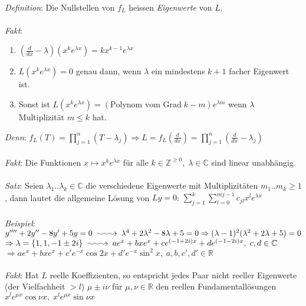 \documentclass[12pt,a4paper,titlepage]{article}
\makeatletter
\newcommand{\longsquiggly}{\xymatrix{{}\ar@{~>}[r]&{}}}
\makeatother
\begin{document}
\\
\textit{Definition}: Die Nullstellen von $f_L$ heissen \emph{Eigenwerte} von $L$. \\
\\
\textit{Fakt}: \begin{enumerate}[label=(\alph*)]
\item $(\frac{d}{dx}-\lambda)(x^ke^{\lambda x})=kx^{k-1}e^{\lambda x}$
\item $L(x^ke^{\lambda x})=0$ genau dann, wenn $\lambda$ ein mindestens $k+1$ facher Eigenwert ist.
\item Sonst ist $L(x^ke^{\lambda x})=(\text{Polynom vom Grad}\; k-m)e^{\lambda m}$ wenn $\lambda$ Multiplizität $m\leq k$ hat.
\end{enumerate}
\textit{Denn}: $f_L(T)=\prod\limits_{j=1}^n(T-\lambda_j) \Rightarrow L=f_L(\frac{d}{dx})=\prod\limits_{j=1}^n(\frac{d}{dx}-\lambda_j)$ \\
\\
\textit{Fakt}: Die Funktionen $x\mapsto x^ke^{\lambda x}$ für alle $k\in\mathbb{Z}^{\geq0},\;\lambda\in\mathbb{C}$ sind linear unabhängig. \\
\\
\textit{Satz}: Seien $\lambda_1..\lambda_k\in\mathbb{C}$ die verschiedene Eigenwerte mit Multiplizitäten $m_1..m_k\geq 1$, dann lautet die allgemeine Lösung von $Ly=0$: $\sum_{j=1}^k\sum_{l=0}^{mj-1} c_{jl}x^le^{\lambda x}$ \\
\\
\textit{Beispiel}: $y''''+2y''-8y'+5y=0 \longsquiggly \lambda^4+2\lambda^2-8\lambda+5=0 \Rightarrow (\lambda-1)^2(\lambda^2+2\lambda+5)=0$ \\
$\Rightarrow \lambda=\{1,1,-1\pm2i\} \longsquiggly ae^x+bxe^x+ce^{(-1+2i)x}+de^{(-1-2i)x},\;c,d\in\mathbb{C} $ \\
$\Rightarrow ae^x+bxe^x+c'e^{-x}\cos 2x+d'e^{-x}\sin^2x,\;a,b,c',d'\in\mathbb{R}$ \\
\\
\textit{Fakt}: Hat $L$ reelle Koeffizienten, so entspricht jedes Paar nicht reeller Eigenwerte (der Vielfachheit $>l$) $\mu\pm i\nu$ für $\mu,\nu\in\mathbb{R}$ den reellen Fundamentallösungen $x^le^{\mu x}\cos\nu x, \;x^le^{\mu x}\sin\nu x$
\end{document}
